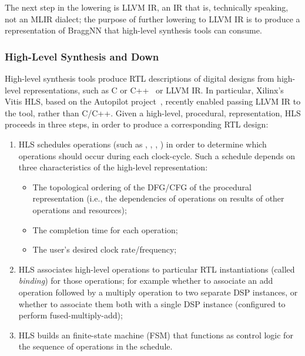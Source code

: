 The next step in the lowering is LLVM IR, an IR that is, technically speaking, not an MLIR dialect; the purpose of further lowering to LLVM IR is to produce a representation of BraggNN that high-level synthesis tools can consume.

\subsubsection{High-Level Synthesis and Down}\label{subsec:hlsdown}

High-level synthesis tools produce RTL descriptions of digital designs from high-level representations, such as C or C++~\cite{10.1145/2514740, ferrandi2021bambu} or LLVM IR.
In particular, Xilinx's Vitis HLS, based on the Autopilot project~\cite{Zhang2008}, recently enabled passing LLVM IR to the tool, rather than C/C++.
Given a high-level, procedural, representation, HLS proceeds in three steps, in order to produce a corresponding RTL design:
\begin{enumerate}
	\item HLS schedules operations (such as , , , ) in order to determine which operations should occur during each clock-cycle. Such a schedule depends on three characteristics of the high-level representation:
	      \begin{itemize}
		      \item The topological ordering of the DFG/CFG of the procedural representation (i.e., the dependencies of operations on results of other operations and resources);
		      \item The completion time for each operation;
		      \item The user's desired clock rate/frequency;
	      \end{itemize}
	\item HLS associates high-level operations to particular RTL instantiations (called \emph{binding}) for those operations; for example whether to associate an add operation followed by a multiply operation to two separate DSP instances, or whether to associate them both with a single DSP instance (configured to perform fused-multiply-add);
	\item HLS builds an finite-state machine (FSM) that functions as control logic for the sequence of operations in the schedule.
\end{enumerate}

